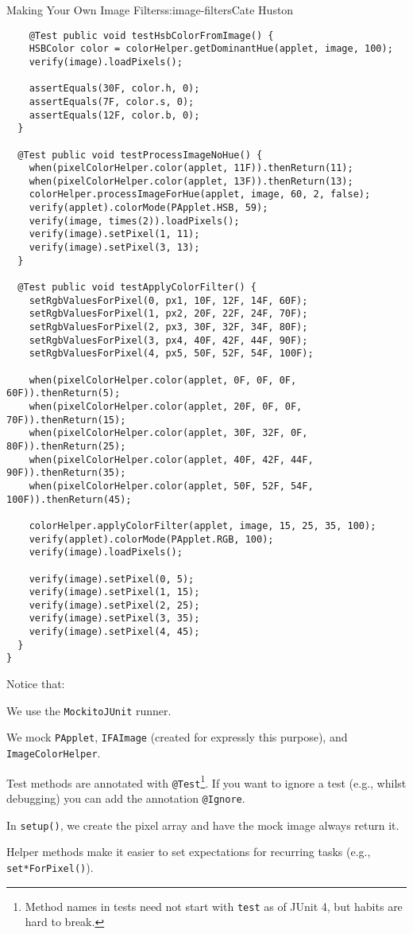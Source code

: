 \begin{aosachapter}{Making Your Own Image Filters}{s:image-filters}{Cate Huston}
\begin{verbatim}
    @Test public void testHsbColorFromImage() {
    HSBColor color = colorHelper.getDominantHue(applet, image, 100);
    verify(image).loadPixels();

    assertEquals(30F, color.h, 0);
    assertEquals(7F, color.s, 0);
    assertEquals(12F, color.b, 0);
  }

  @Test public void testProcessImageNoHue() {
    when(pixelColorHelper.color(applet, 11F)).thenReturn(11);
    when(pixelColorHelper.color(applet, 13F)).thenReturn(13);
    colorHelper.processImageForHue(applet, image, 60, 2, false);
    verify(applet).colorMode(PApplet.HSB, 59);
    verify(image, times(2)).loadPixels();
    verify(image).setPixel(1, 11);
    verify(image).setPixel(3, 13);
  }

  @Test public void testApplyColorFilter() {
    setRgbValuesForPixel(0, px1, 10F, 12F, 14F, 60F);
    setRgbValuesForPixel(1, px2, 20F, 22F, 24F, 70F);
    setRgbValuesForPixel(2, px3, 30F, 32F, 34F, 80F);
    setRgbValuesForPixel(3, px4, 40F, 42F, 44F, 90F);
    setRgbValuesForPixel(4, px5, 50F, 52F, 54F, 100F);

    when(pixelColorHelper.color(applet, 0F, 0F, 0F, 60F)).thenReturn(5);
    when(pixelColorHelper.color(applet, 20F, 0F, 0F, 70F)).thenReturn(15);
    when(pixelColorHelper.color(applet, 30F, 32F, 0F, 80F)).thenReturn(25);
    when(pixelColorHelper.color(applet, 40F, 42F, 44F, 90F)).thenReturn(35);
    when(pixelColorHelper.color(applet, 50F, 52F, 54F, 100F)).thenReturn(45);

    colorHelper.applyColorFilter(applet, image, 15, 25, 35, 100);
    verify(applet).colorMode(PApplet.RGB, 100);
    verify(image).loadPixels();

    verify(image).setPixel(0, 5);
    verify(image).setPixel(1, 15);
    verify(image).setPixel(2, 25);
    verify(image).setPixel(3, 35);
    verify(image).setPixel(4, 45);
  }
}
\end{verbatim}

Notice that:

\begin{aosaitemize}

\item
  We use the \texttt{MockitoJUnit} runner.
\item
  We mock \texttt{PApplet}, \texttt{IFAImage} (created for expressly
  this purpose), and \texttt{ImageColorHelper}.
\item
  Test methods are annotated with \texttt{@Test}\footnote{Method names
    in tests need not start with \texttt{test} as of JUnit 4, but habits
    are hard to break.}. If you want to ignore a test (e.g., whilst
  debugging) you can add the annotation \texttt{@Ignore}.
\item
  In \texttt{setup()}, we create the pixel array and have the mock image
  always return it.
\item
  Helper methods make it easier to set expectations for recurring tasks
  (e.g., \texttt{set*ForPixel()}).
\end{aosaitemize}


\end{aosachapter}
